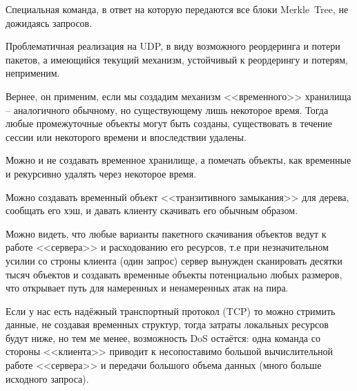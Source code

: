 \documentclass[11pt,a4paper]{article}
\begin{document}
Специальная команда, в ответ на которую передаются все блоки Merkle~Tree, не
дожидаясь запросов.

Проблематичная реализация на UDP, в виду возможного реордеринга и потери
пакетов, а имеющийся текущий механизм, устойчивый к реордерингу и потерям,
неприменим.

Вернее, он применим, если мы создадим механизм <<временного>> хранилища --
аналогичного обычному, но существующему лишь некоторое время. Тогда
любые промежуточные объекты могут быть созданы, существовать в
течение сессии или некоторого времени и впоследствии удалены.

Можно и не создавать временное хранилище, а помечать объекты, как временные
и рекурсивно удалять через некоторое время.

Можно создавать временный объект <<транзитивного замыкания>> для дерева,
сообщать его хэш, и давать клиенту скачивать его обычным образом.

Можно видеть, что любые варианты пакетного скачивания объектов ведут к
работе <<сервера>> и расходованию его ресурсов, т.е при незначительном
усилии со строны клиента (один запрос) сервер вынужден сканировать десятки
тысяч объектов и создавать временные объекты потенциально любых размеров,
что открывает путь для намеренных и ненамеренных атак на пира.

Если у нас есть надёжный транспортный протокол (TCP) то можно стримить данные,
не создавая временных структур, тогда затраты локальных ресурсов будут ниже,
но тем ме менее, возможность DoS остаётся: одна команда со стороны <<клиента>>
приводит к несопоставимо большой вычислительной работе <<сервера>> и передачи
большого объема данных (много больше исходного запроса).
\end{document}
